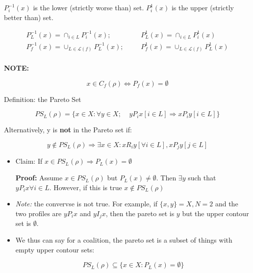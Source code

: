 \documentclass{article}
\newcommand{\Lm}{\mathcal{L}}
\newcommand{\core}{C_{f}(\rho)}
\begin{document}
$P_i^{-1}(x)$ is the lower (strictly worse than) set.
$P_i^{1}(x)$ is the upper (strictly better than) set.

\begin{align*}
P_L^{-1}(x) = \cap_{i\in L} P_i^{-1}(x); \;\;\; & \;\;\;  P_L^{1}(x) = \cap_{i \in L} P_i^{1}(x)\\
P_f^{-1}(x) = \cup_{L\in \Lm(f)} P_L^{-1}(x); \;\;\;&\;\;\;  P_f^{1}(x) = \cup_{L\in \Lm(f)} P_L^{1}(x)\\
\end{align*}

\textbf{NOTE:}

\[
x \in \core \Leftrightarrow P_f(x) = \emptyset
\]

Definition: the Pareto Set

\[
PS_L(\rho) = \{x\in X: \forall y \in X; \;\;\;\;yP_ix [i \in L] \Rightarrow xP_iy [i \in L] \}
\]

Alternatively, y is \textbf{not} in the Pareto set if:

\[
y \not \in PS_L(\rho) \Rightarrow \exists x \in X: xR_iy [\forall i \in L], xP_jy[ j \in L]
\]

\begin{itemize}

\item Claim: If $x \in PS_L(\rho)\Rightarrow P_L(x) = \emptyset$

\textbf{Proof:} Assume $x \in PS_L(\rho)$ but $P_L(x) \neq \emptyset$. Then $\exists y$ such that $yP_ix \forall i\in L
.$ However, if this is true $x \not\in PS_L(\rho)$


\item \emph{Note:} the convervse is not true. For example, if $\{x,y\} = X, N=2$ and the two profiles are $yP_ix$ and $yI_jx$, then the pareto set is $y$ but the upper contour set is $\emptyset$.

\item We thus can say for a coalition, the pareto set is a subset of things with empty upper contour sets:

\[
PS_L(\rho) \subseteq \{x\in X: P_L(x) = \emptyset\}
\]

\end{itemize}
\end{document}

